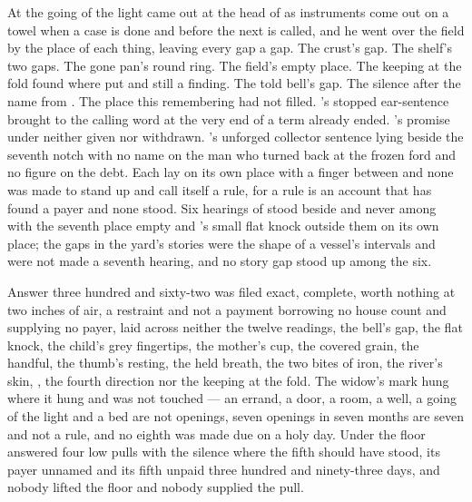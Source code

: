 At the going of the light  came out at the head of  as instruments come out on a towel when a case is done and before the next is called, and he went over the field by the place of each thing, leaving every gap a gap. The crust's gap. The shelf's two gaps. The gone pan's round ring. The field's empty place. The keeping at the fold found where put and still a finding. The told bell's gap. The silence after the name from . The place this remembering had not filled. 's stopped ear-sentence brought to the calling word at the very end of a term already ended. 's promise under  neither given nor withdrawn. 's unforged collector sentence lying beside the seventh notch with no name on the man who turned back at the frozen ford and no figure on the debt. Each lay on its own place with a finger between and none was made to stand up and call itself a rule, for a rule is an account that has found a payer and none stood. Six hearings of  stood beside and never among with the seventh place empty and 's small flat knock outside them on its own place; the gaps in the yard's stories were the shape of a vessel's intervals and were not made a seventh hearing, and no story gap stood up among the six.

Answer three hundred and sixty-two was filed exact, complete, worth nothing at two inches of air, a restraint and not a payment borrowing no house count and supplying no payer, laid across neither the twelve readings, the bell's gap, the flat knock, the child's grey fingertips, the mother's cup, the covered grain, the handful, the thumb's resting, the held breath, the two bites of iron, the river's skin, , the fourth direction nor the keeping at the fold. The widow's mark hung where it hung and was not touched --- an errand, a door, a room, a well, a going of the light and a bed are not openings, seven openings in seven months are seven and not a rule, and no eighth was made due on a holy day. Under the floor  answered four low pulls with the silence where the fifth should have stood, its payer unnamed and its fifth unpaid three hundred and ninety-three days, and nobody lifted the floor and nobody supplied the pull.

